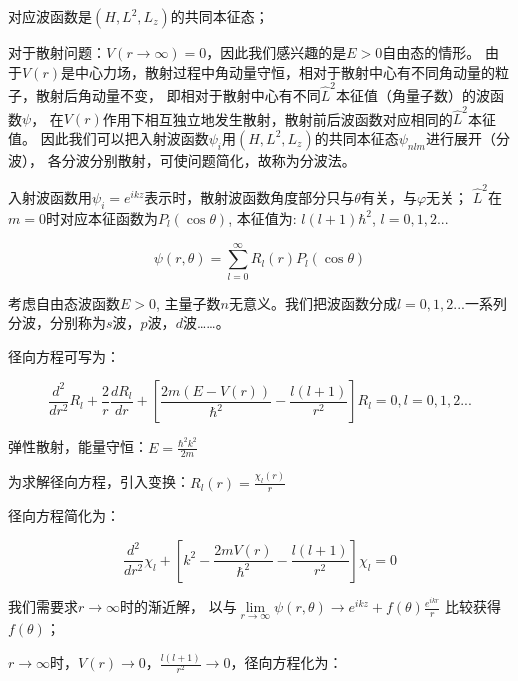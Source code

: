 对应波函数是$\left( {H,L^2 ,L_z } \right)$的共同本征态；

对于散射问题：$V\left( {r \to \infty } \right) = 0$，因此我们感兴趣的是$E > 0$自由态的情形。
由于$V(r)$是中心力场，散射过程中角动量守恒，相对于散射中心有不同角动量的粒子，散射后角动量不变，
即相对于散射中心有不同$\hat L^2$本征值（角量子数）的波函数$\psi$，
在$V(r)$作用下相互独立地发生散射，散射前后波函数对应相同的$\hat L^2$本征值。
因此我们可以把入射波函数$\psi_i$用$\left( {H,L^2 ,L_z } \right)$的共同本征态$\psi_{nlm}$进行展开（分波），
各分波分别散射，可使问题简化，故称为分波法。


入射波函数用$\psi _i  = e^{ikz} $表示时，散射波函数角度部分只与$\theta$有关，与$\varphi$无关；
$\hat L^2$在$m = 0$时对应本征函数为$P_l \left( {\cos \theta } \right)$, 本征值为: $l\left( {l + 1} \right)\hbar ^2 $,
$l = 0,1,2...$


\begin{equation}\label{26-7}
\psi \left( {r,\theta } \right) = \sum\limits_{l = 0}^\infty  {R_l (r)P_l (\cos \theta )}
\end{equation}

考虑自由态波函数$E > 0$, 主量子数$n$无意义。我们把波函数分成$l = 0,1,2...$一系列分波，分别称为$s$波，$p$波，$d$波……。


径向方程可写为：

\begin{equation}\label{26-8}
\frac{{d^2 }}{{dr^2 }}R_l  + \frac{2}{r}\frac{{dR_l }}{{dr}} + \left[ {\frac{{2m\left( {E - V(r)} \right)}}{{\hbar ^2 }} - \frac{{l\left( {l + 1} \right)}}{{r^2 }}} \right]R_l  = 0, l = 0,1,2...
\end{equation}

弹性散射，能量守恒：$E = \frac{{\hbar ^2 k^2 }}{{2m}}$


为求解径向方程，引入变换：$R_l (r) = \frac{{\chi _l (r)}}{r}$


径向方程简化为：

\begin{equation}\label{26-9}
\frac{{d^2 }}{{dr^2 }}\chi _l  + \left[ {k^2  - \frac{{2mV(r)}}{{\hbar ^2 }} - \frac{{l\left( {l + 1} \right)}}{{r^2 }}} \right]\chi _l  = 0
\end{equation}


我们需要求$r \to \infty $时的渐近解，
以与$\mathop {\lim }\limits_{r \to \infty } \psi
\left( {r,\theta } \right) \to e^{ikz}  + f\left( \theta  \right)\frac{{e^{ikr} }}{r}$
比较获得$f\left( \theta  \right)$；


$r \to \infty $时，$V(r) \to 0$，$\frac{{l\left( {l + 1} \right)}}{{r^2 }} \to 0$，径向方程化为：

